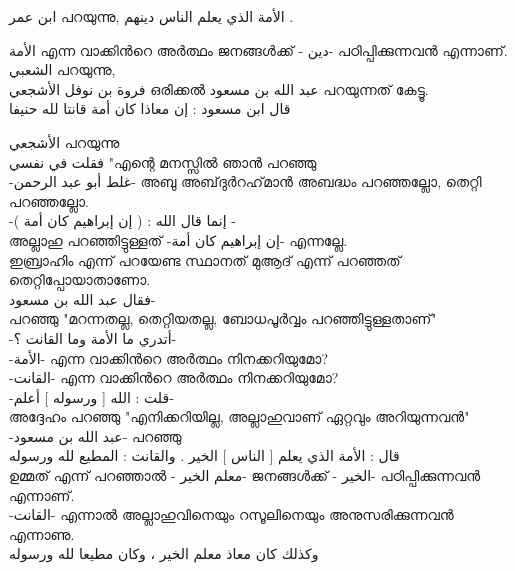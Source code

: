  
 \textarabic{ ابن عمر} പറയുന്നു, \textarabic{الأمة الذي يعلم الناس دينهم .}
 
   \textarabic{الأمة} എന്ന വാക്കിൻറെ അർത്ഥം ജനങ്ങൾക്ക് -\textarabic{ دين}- പഠിപ്പിക്കുന്നവൻ എന്നാണ്. \\
 
 
 
 \textarabic{الشعبي} പറയുന്നു, \\
 \textarabic{فروة بن نوفل الأشجعي}  ഒരിക്കൽ \textarabic{عبد الله بن مسعود} പറയുന്നത് കേട്ടൂ. \\ 
 \textarabic{ قال ابن مسعود : إن معاذا كان أمة قانتا لله حنيفا}
 
 \textarabic{الأشجعي} പറയുന്നു \\
 \textarabic{ فقلت في نفسي} "എന്റെ മനസ്സിൽ ഞാൻ പറഞ്ഞു \\ -\textarabic{غلط أبو عبد الرحمن}- അബു അബ്‌ദുർറഹ്‌മാൻ അബദ്ധം പറഞ്ഞല്ലോ, തെറ്റി പറഞ്ഞല്ലോ. \\-\textarabic{إنما قال الله : ( إن إبراهيم كان أمة ) }- \\
 അല്ലാഹു പറഞ്ഞിട്ടുള്ളത് -\textarabic{إن إبراهيم كان أمة}-  എന്നല്ലേ. \\
 ഇബ്രാഹിം എന്ന് പറയേണ്ട സ്ഥാനത് മുആദ് എന്ന് പറഞ്ഞത് തെറ്റിപ്പോയാതാണോ.  \\
 \textarabic{فقال عبد الله بن مسعود}- \\
 പറഞ്ഞു 
 "മറന്നതല്ല, തെറ്റിയതല്ല, ബോധപൂർവ്വം പറഞ്ഞിട്ടുള്ളതാണ്" \\
 -\textarabic{أتدري ما الأمة وما القانت ؟}- \\
 -\textarabic{الأمة}- എന്ന വാക്കിൻറെ അർത്ഥം നിനക്കറിയുമോ? \\
 -\textarabic{القانت}- എന്ന വാക്കിൻറെ അർത്ഥം നിനക്കറിയുമോ? \\
 
 -\textarabic{قلت : الله [ ورسوله ] أعلم}- \\
 അദ്ദേഹം പറഞ്ഞു "എനിക്കറിയില്ല, അല്ലാഹുവാണ് ഏറ്റവും അറിയുന്നവൻ" \\
 
 -\textarabic{عبد الله بن مسعود}- പറഞ്ഞു \\
 \textarabic{ قال : الأمة الذي يعلم [ الناس ] الخير . والقانت : المطيع لله ورسوله} \\
   ഉമ്മത് എന്ന് പറഞ്ഞാൽ -\textarabic{ معلم الخير}- 
 ജനങ്ങൾക്ക് -\textarabic{ الخير}- പഠിപ്പിക്കുന്നവൻ എന്നാണ്. \\
 -\textarabic{القانت}- എന്നാൽ അല്ലാഹുവിനെയും റസൂലിനെയും അനുസരിക്കുന്നവൻ എന്നാണു. \\
 
 
 \textarabic{وكذلك كان معاذ معلم الخير ، وكان مطيعا لله ورسوله}
 
